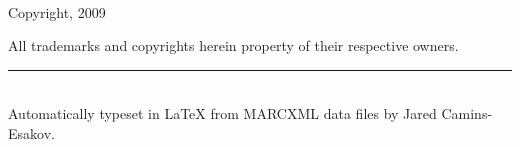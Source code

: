 {\small
~\\[4cm]

\begin{center}
Copyright, 2009\\[2cm]
\end{center}

\begin{flushleft}
All trademarks and copyrights herein property of their respective owners.

\vfill

\rule{6cm}{0.25mm}\\[0.2cm]
Automatically typeset in {\LaTeX} from MARCXML data files by Jared Camins-Esakov.
\end{flushleft}
}
